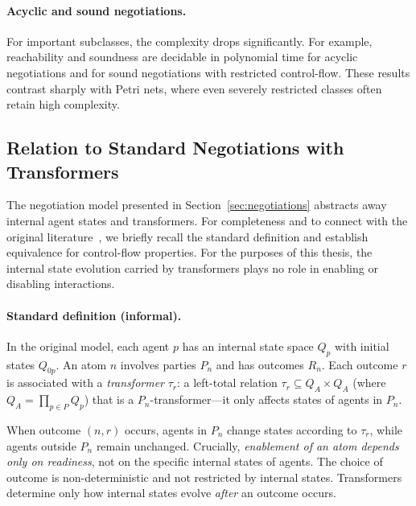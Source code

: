 \paragraph{Acyclic and sound negotiations.}
For important subclasses, the complexity drops significantly. For example, reachability and soundness are decidable in polynomial time for acyclic negotiations and for sound negotiations with restricted control-flow. These results contrast sharply with Petri nets, where even severely restricted classes often retain high complexity.


\subsection{Relation to Standard Negotiations with Transformers}
\label{sec:standard-def}

The negotiation model presented in Section~\ref{sec:negotiations} abstracts away internal agent states and transformers. For completeness and to connect with the original literature~\cite{EsparzaDeselNegotiations}, we briefly recall the standard definition and establish equivalence for control-flow properties. For the purposes of this thesis, the internal state evolution carried by transformers plays no role in enabling or disabling interactions.

\paragraph{Standard definition (informal).} In the original model, each agent $p$ has an internal state space $Q_p$ with initial states $Q_{0p}$. An atom $n$ involves parties $P_n$ and has outcomes $R_n$. Each outcome $r$ is associated with a \emph{transformer} $\tau_r$: a left-total relation $\tau_r \subseteq Q_A \times Q_A$ (where $Q_A = \prod_{p \in P} Q_p$) that is a $P_n$-transformer—it only affects states of agents in $P_n$.

When outcome $(n,r)$ occurs, agents in $P_n$ change states according to $\tau_r$, while agents outside $P_n$ remain unchanged. Crucially, \emph{enablement of an atom depends only on readiness}, not on the specific internal states of agents. The choice of outcome is non-deterministic and not restricted by internal states. Transformers determine only how internal states evolve \emph{after} an outcome occurs.

